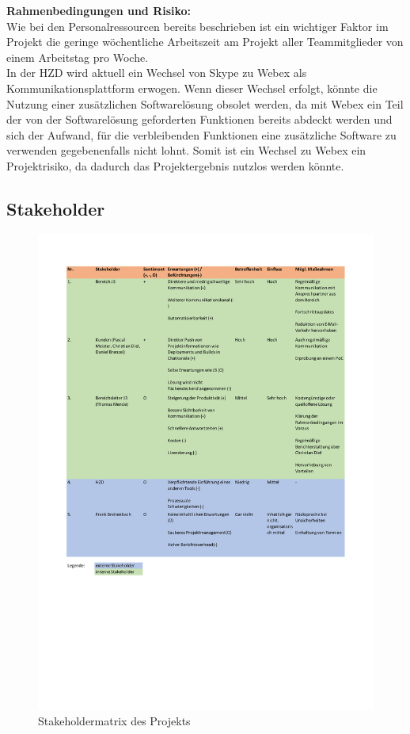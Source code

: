 \documentclass[ThesisDJ.tex]{subfiles}
\begin{document}
	\textbf{Rahmenbedingungen und Risiko:}\medskip\\
	Wie bei den Personalressourcen bereits beschrieben ist ein wichtiger Faktor im Projekt die geringe wöchentliche Arbeitszeit am Projekt aller Teammitglieder von einem Arbeitstag pro Woche.\\	
	In der HZD wird aktuell ein Wechsel von Skype zu Webex als Kommunikationsplattform erwogen. Wenn dieser Wechsel erfolgt, könnte die Nutzung einer zusätzlichen Softwarelösung obsolet werden, da mit Webex ein Teil der von der Softwarelösung geforderten Funktionen bereits abdeckt werden und sich der Aufwand, für die verbleibenden Funktionen eine zusätzliche Software zu verwenden gegebenenfalls nicht lohnt. Somit ist ein Wechsel zu Webex ein Projektrisiko, da dadurch das Projektergebnis nutzlos werden könnte. 
	\subsection{Stakeholder}
  \begin{figure}[h!]
    \includegraphics[width=\textwidth]{Stakeholdermatrix.pdf}
    \centering
    \caption{Stakeholdermatrix des Projekts}
    \label{fig:stakeholders}
  \end{figure}
\end{document}
